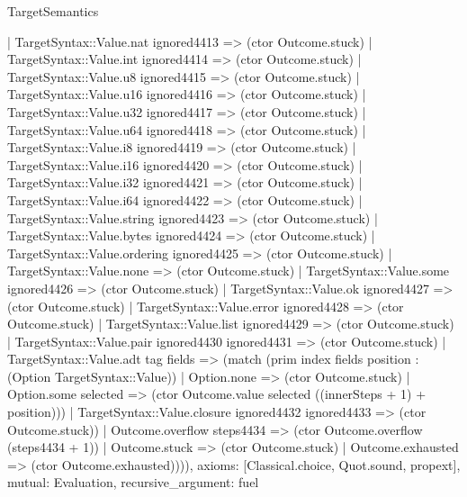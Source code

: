 \begin{lexlean}{TargetSemantics}
\begin{semanticmodule}
{          | TargetSyntax::Value.nat ignored4413 => (ctor Outcome.stuck)
          | TargetSyntax::Value.int ignored4414 => (ctor Outcome.stuck)
          | TargetSyntax::Value.u8 ignored4415 => (ctor Outcome.stuck)
          | TargetSyntax::Value.u16 ignored4416 => (ctor Outcome.stuck)
          | TargetSyntax::Value.u32 ignored4417 => (ctor Outcome.stuck)
          | TargetSyntax::Value.u64 ignored4418 => (ctor Outcome.stuck)
          | TargetSyntax::Value.i8 ignored4419 => (ctor Outcome.stuck)
          | TargetSyntax::Value.i16 ignored4420 => (ctor Outcome.stuck)
          | TargetSyntax::Value.i32 ignored4421 => (ctor Outcome.stuck)
          | TargetSyntax::Value.i64 ignored4422 => (ctor Outcome.stuck)
          | TargetSyntax::Value.string ignored4423 => (ctor Outcome.stuck)
          | TargetSyntax::Value.bytes ignored4424 => (ctor Outcome.stuck)
          | TargetSyntax::Value.ordering ignored4425 => (ctor Outcome.stuck)
          | TargetSyntax::Value.none => (ctor Outcome.stuck)
          | TargetSyntax::Value.some ignored4426 => (ctor Outcome.stuck)
          | TargetSyntax::Value.ok ignored4427 => (ctor Outcome.stuck)
          | TargetSyntax::Value.error ignored4428 => (ctor Outcome.stuck)
          | TargetSyntax::Value.list ignored4429 => (ctor Outcome.stuck)
          | TargetSyntax::Value.pair ignored4430 ignored4431 => (ctor Outcome.stuck)
          | TargetSyntax::Value.adt tag fields => (match (prim index fields position : (Option TargetSyntax::Value))
            | Option.none => (ctor Outcome.stuck)
            | Option.some selected => (ctor Outcome.value selected ((innerSteps + 1) + position)))
          | TargetSyntax::Value.closure ignored4432 ignored4433 => (ctor Outcome.stuck))
        | Outcome.overflow steps4434 => (ctor Outcome.overflow (steps4434 + 1))
        | Outcome.stuck => (ctor Outcome.stuck)
        | Outcome.exhausted => (ctor Outcome.exhausted)))),
  axioms: [Classical.choice, Quot.sound, propext],
  mutual: Evaluation,
  recursive_argument: fuel
}


\end{semanticmodule}
\end{lexlean}
